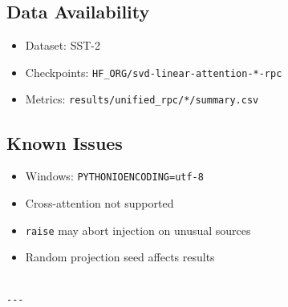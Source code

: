 \subsection{Data Availability}

\begin{itemize}
\item Dataset: SST-2
\item Checkpoints: \texttt{{{HF\_ORG}}/svd-linear-attention-*-rpc}
\item Metrics: \texttt{results/unified\_rpc/*/summary.csv}

\end{itemize}
\subsection{Known Issues}

\begin{itemize}
\item Windows: \texttt{PYTHONIOENCODING=utf-8}
\item Cross-attention not supported
\item \texttt{raise} may abort injection on unusual sources
\item Random projection seed affects results
\end{itemize}
\begin{lstlisting}

---
\end{lstlisting}